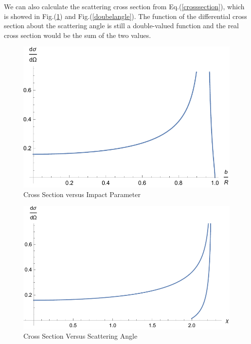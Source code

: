 \documentclass[%
 reprint,
 amsmath,amssymb,
 aps,
]{revtex4-1}
\begin{document}
We can also calculate the scattering cross section from Eq.(\ref{crosssection}), which is showed in Fig.(\ref{doubleparameter}) and Fig.(\ref{doubelangle}). The function of the differential cross section about the scattering angle is still a double-valued function and the real cross section would be the sum of the two values.
\begin{figure}
    \centering
    \includegraphics[scale=0.6]{crosssectiondouble.pdf}
    \caption{Cross Section versus Impact Parameter}
    \label{doubleparameter}
\end{figure}
\begin{figure}
    \centering
    \includegraphics[scale=0.6]{crossectiondoubleofchi.pdf}
    \caption{Cross Section Versus Scattering Angle}
    \label{doubleangle}
\end{figure}
\end{document}
